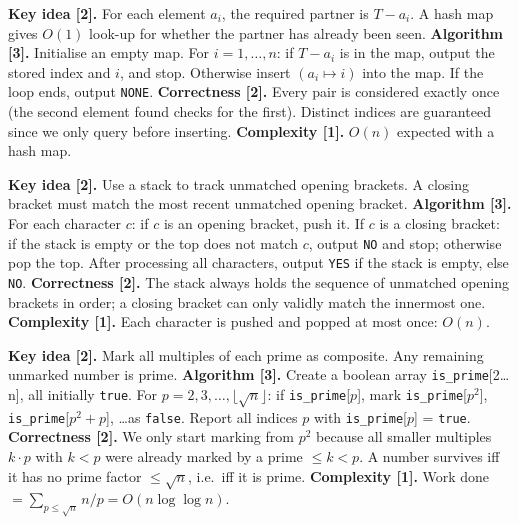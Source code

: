 \begin{solution}
\textbf{Key idea [2].} For each element $a_i$, the required partner is $T - a_i$. A hash map gives $O(1)$ look-up for whether the partner has already been seen.
\textbf{Algorithm [3].} Initialise an empty map. For $i = 1, \ldots, n$: if $T - a_i$ is in the map, output the stored index and $i$, and stop. Otherwise insert $(a_i \mapsto i)$ into the map. If the loop ends, output \texttt{NONE}.
\textbf{Correctness [2].} Every pair is considered exactly once (the second element found checks for the first). Distinct indices are guaranteed since we only query before inserting.
\textbf{Complexity [1].} $O(n)$ expected with a hash map.
\end{solution}

\begin{solution}
\textbf{Key idea [2].} Use a stack to track unmatched opening brackets. A closing bracket must match the most recent unmatched opening bracket.
\textbf{Algorithm [3].} For each character $c$: if $c$ is an opening bracket, push it. If $c$ is a closing bracket: if the stack is empty or the top does not match $c$, output \texttt{NO} and stop; otherwise pop the top. After processing all characters, output \texttt{YES} if the stack is empty, else \texttt{NO}.
\textbf{Correctness [2].} The stack always holds the sequence of unmatched opening brackets in order; a closing bracket can only validly match the innermost one.
\textbf{Complexity [1].} Each character is pushed and popped at most once: $O(n)$.
\end{solution}

\begin{solution}
\textbf{Key idea [2].} Mark all multiples of each prime as composite. Any remaining unmarked number is prime.
\textbf{Algorithm [3].} Create a boolean array \texttt{is\_prime}[2\ldots n], all initially \texttt{true}. For $p = 2, 3, \ldots, \lfloor\sqrt{n}\rfloor$: if \texttt{is\_prime}[$p$], mark \texttt{is\_prime}[$p^2$], \texttt{is\_prime}[$p^2+p$], \ldots as \texttt{false}. Report all indices $p$ with \texttt{is\_prime}[$p$] = \texttt{true}.
\textbf{Correctness [2].} We only start marking from $p^2$ because all smaller multiples $k \cdot p$ with $k < p$ were already marked by a prime $\le k < p$. A number survives iff it has no prime factor $\le \sqrt{n}$, i.e.\ iff it is prime.
\textbf{Complexity [1].} Work done $= \sum_{p \le \sqrt{n}} n/p = O(n \log \log n)$.
\end{solution}

